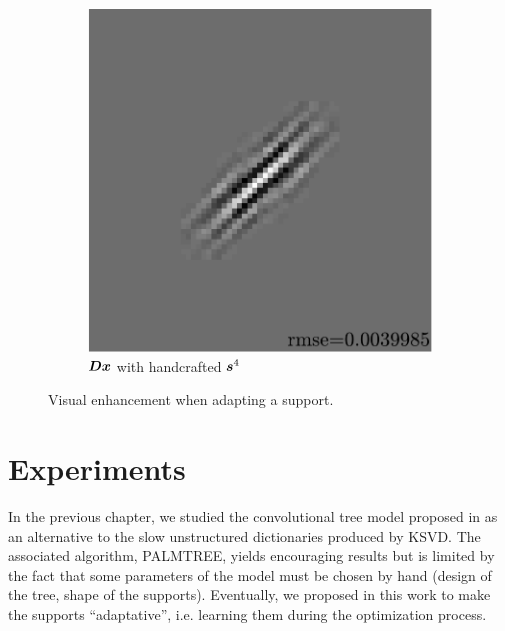 \begin{figure}[!ht]
\begin{subfigure}[b]{0.085\textwidth}
	\caption{}
\end{subfigure}
\begin{subfigure}[b]{0.39\textwidth}\centering
	\includegraphics[width=\textwidth]{figures/exple-better-support/xp_128x128_sc2_angl1_K3_S3_node4expected_approx.pdf}
	\caption{$\bm{D}\bm{x}$ with handcrafted $\bm{s}^4$}\label{fig_xp_fixed_vs_expected_approx2}
\end{subfigure}
\caption{Visual enhancement when adapting a support.}\label{fig_xp_fixed_vs_expected}
\end{figure}




\chapter{Experiments}

In the previous chapter, we studied the convolutional tree model proposed in \cite{chabiron_optimization_2016} as an alternative to the slow unstructured dictionaries produced by \ac{KSVD}. The associated algorithm, PALMTREE, yields encouraging results but is limited by the fact that some parameters of the model must be chosen by hand (design of the tree, shape of the supports). Eventually, we proposed in this work to make the supports “adaptative”, i.e. learning them during the optimization process.

